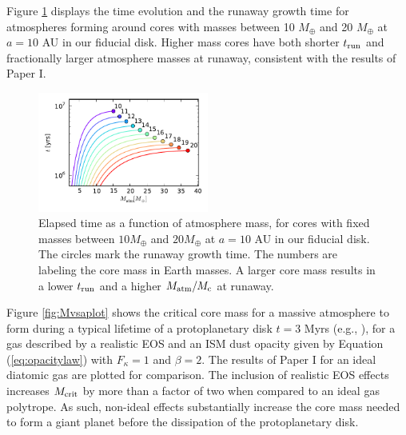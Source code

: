 \documentclass[apj]{emulateapj}
\newcommand{\co}{_{\rm c}}
\begin{document}

Figure \ref{fig:tvsMplot} displays the time evolution and the runaway growth time for atmospheres forming around cores with masses between 10 $M_{\oplus}$ and 20 $M_{\oplus}$ at $a=10$ AU in our fiducial disk. Higher mass cores have both shorter $t_{\rm run}$ and fractionally larger atmosphere masses at runaway, consistent with the results of Paper I. 

\begin{figure}[h!]
\centering
\includegraphics[width=0.5\textwidth]{../../figs/ModelAtmospheres/RadSelfGravRealEOS/PaperFigs/t_vs_M_10au.pdf}
\caption{Elapsed time as a function of atmosphere mass, for cores with fixed masses between $10 M_{\oplus}$ and $20 M_{\oplus}$ at $a=10$ AU in our fiducial disk. The circles mark the runaway growth time. The numbers are labeling the core mass in Earth masses. A larger core mass results in a lower $t_{\rm run}$ and a higher $M_{\rm atm}/M\co$ at runaway.}
\label{fig:tvsMplot}
\end{figure}



Figure \ref{fig:Mvsaplot} shows the critical core mass for a massive atmosphere to form during a typical lifetime of a protoplanetary disk $t=3$ Myrs (e.g., \citealt{jay99}), for a gas described by a realistic EOS and an ISM dust opacity given by Equation (\ref{eq:opacitylaw}) with $F_{\kappa}=1$ and $\beta=2$. The results of Paper I for an ideal diatomic gas are plotted for comparison. The inclusion of realistic EOS effects increases $M_{\rm crit}$ by more than a factor of two when compared to an ideal gas polytrope. As such, non-ideal effects substantially increase the core mass needed to form a giant planet  before the dissipation of the protoplanetary disk.   
\end{document}
